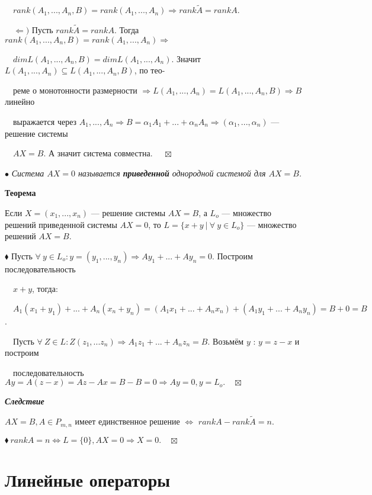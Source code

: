 \documentclass[a4paper, 12pt]{report}
\begin{document}
	$\quad rank(A_1,...,A_n,B) = rank(A_1,...,A_n) \Rightarrow rank\tilde{A} =rank A$.
	
	$\quad \Leftarrow)$ Пусть $rank\tilde{A} =rank A$. Тогда $ rank(A_1,...,A_n,B) = rank(A_1,...,A_n) \Rightarrow$
	
	$\quad dimL(A_1,...,A_n,B) = dimL(A_1,...,A_n).$ Значит $L(A_1,...,A_n) \subseteq L(A_1, ..., A_n, B)$, по тео-
	
	$\quad$реме о монотонности размерности $\Rightarrow L(A_1,...,A_n)=L(A_1, ..., A_n, B) \Rightarrow B$ линейно 
	
	$\quad$выражается через $A_1,...,A_n \Rightarrow B =  \alpha_1 A_1 + ... + \alpha_n A_n \Rightarrow (\alpha_1,...,\alpha_n)$ --- решение системы 
	
	$\quad AX = B$. А значит система совместна. $\quad \boxtimes$
	\par\bigskip
	$\bullet$\textit{ Система $AX = 0$ называется \textbf{приведенной} однородной системой для $AX = B$.}
	\par\bigskip
	\textbf{Теорема}
	
	Если $X = (x_1,...,x_n)$ --- решение системы  $AX=B$, а $L_o$ --- множество решений приведенной системы $AX = 0$, то $L = \{ x + y \ | \ \forall \ y\in L_o \}$ --- множество решений $AX = B$.
	\par\bigskip
	$\blacklozenge$ Пусть $\forall \ y \in L_o : y = (y_1,...,y_n) \Rightarrow Ay_1+...+Ay_n = 0$. Построим последовательность
	
	$\quad x+y$, тогда:
	
	$\quad A_1(x_1 + y_1) + ... + A_n(x_n + y_n)=(A_1 x_1 + ... + A_n x_n) + (A_1 y_1 + ... + A_n y_n) = B + 0 = B$.
	
	$\quad$Пусть $\forall \ Z\in L : Z(z_1,...z_n) \Rightarrow A_1z_1 + ... + A_nz_n = B$. Возьмём $y$ : $y=z-x$ и построим 
	
	$\quad$последовательность
	$Ay = A(z-x) = Az - Ax = B - B=0 \Rightarrow Ay = 0, y = L_o. \quad \boxtimes$
	\par\bigskip
	\textit{\textbf{Следствие}}
	
	$AX = B, A\in P_{m,n}$ имеет единственное решение $\Longleftrightarrow$ $rankA - rank\tilde{A} = n$.
	\par\bigskip
	$\blacklozenge \ rankA = n \Longleftrightarrow L=\{0\}, AX = 0 \Rightarrow X = 0. \quad \boxtimes$
	
	\chapter{Линейные операторы}
	
\end{document}
